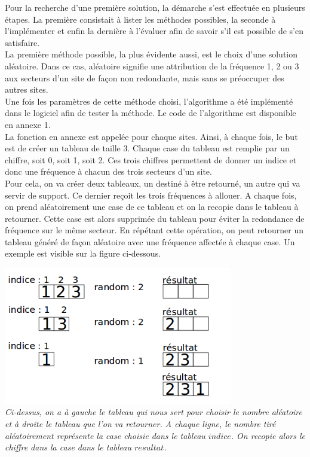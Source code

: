\documentclass[a4paper, 11pt]{report}
\begin{document}
	Pour la recherche d'une première solution, la démarche s'est effectuée en plusieurs étapes. La première consistait à lister les méthodes possibles, la seconde à l'implémenter et enfin la dernière à l'évaluer afin de savoir s'il est possible de s'en satisfaire.\\
	La première méthode possible, la plus évidente aussi, est le choix d'une solution aléatoire. Dans ce cas, aléatoire signifie une attribution de la fréquence 1, 2 ou 3 aux secteurs d'un site de façon non redondante, mais sans se préoccuper des autres sites.\\
	Une fois les paramètres de cette méthode choisi, l'algorithme a été implémenté dans le logiciel afin de tester la méthode. Le code de l'algorithme est disponible en annexe 1.\\
	La fonction en annexe est appelée pour chaque sites. Ainsi, à chaque fois, le but est de créer un tableau de taille 3. Chaque case du tableau est remplie par un chiffre, soit 0, soit 1, soit 2. Ces trois chiffres permettent de donner un indice et donc une fréquence à chacun des trois secteurs d'un site.\\
	Pour cela, on va créer deux tableaux, un destiné à être retourné, un autre qui va servir de support. Ce dernier reçoit les trois fréquences à allouer. A chaque fois, on prend aléatoirement une case de ce tableau et on la recopie dans le tableau à retourner.  Cette case est alors supprimée du tableau pour éviter la redondance de fréquence sur le même secteur. En répétant cette opération, on peut retourner un tableau généré de façon aléatoire avec une fréquence affectée à chaque case. Un exemple est visible sur la figure ci-dessous.
	
	\begin{center}
		\includegraphics[width=10cm]{tableau_al}\\
		\emph{Ci-dessus, on a à gauche le tableau qui nous sert pour choisir le nombre aléatoire et à droite le tableau que l'on va retourner. A chaque ligne, le nombre tiré aléatoirement représente la case choisie dans le tableau $indice$. On recopie alors le chiffre dans la case dans le tableau $resultat$.\\}
	\end{center}
	
\end{document}
